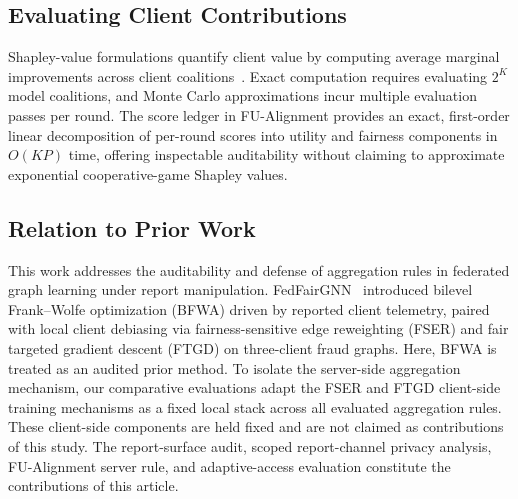 \subsection{Evaluating Client Contributions}
\label{subsec:rw_contribution}

Shapley-value formulations quantify client value by computing average marginal improvements across client coalitions~\citep{shapley1953value, liu2022gtg, tastan2024redefining}. Exact computation requires evaluating $2^K$ model coalitions, and Monte Carlo approximations incur multiple evaluation passes per round. The score ledger in FU-Alignment provides an exact, first-order linear decomposition of per-round scores into utility and fairness components in $O(KP)$ time, offering inspectable auditability without claiming to approximate exponential cooperative-game Shapley values.

\subsection{Relation to Prior Work}
\label{subsec:rw_prior_work}

This work addresses the auditability and defense of aggregation rules in federated graph learning under report manipulation. FedFairGNN~\citep{dang2026fedfairgnn} introduced bilevel Frank--Wolfe optimization (BFWA) driven by reported client telemetry, paired with local client debiasing via fairness-sensitive edge reweighting (FSER) and fair targeted gradient descent (FTGD) on three-client fraud graphs. Here, BFWA is treated as an audited prior method. To isolate the server-side aggregation mechanism, our comparative evaluations adapt the FSER and FTGD client-side training mechanisms as a fixed local stack across all evaluated aggregation rules. These client-side components are held fixed and are not claimed as contributions of this study. The report-surface audit, scoped report-channel privacy analysis, FU-Alignment server rule, and adaptive-access evaluation constitute the contributions of this article.
